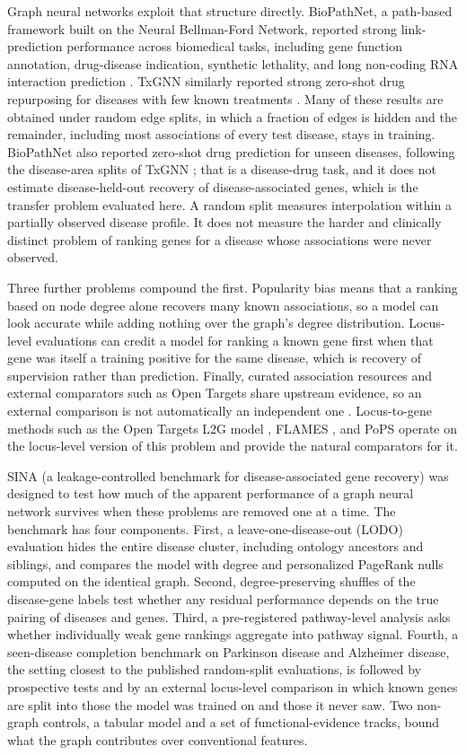 \documentclass[11pt]{article}
\begin{document}
Graph neural networks exploit that structure directly. BioPathNet, a path-based framework built on the Neural Bellman-Ford Network, reported strong link-prediction performance across biomedical tasks, including gene function annotation, drug-disease indication, synthetic lethality, and long non-coding RNA interaction prediction \cite{hu2026,zhu2021}. TxGNN similarly reported strong zero-shot drug repurposing for diseases with few known treatments \cite{huang2024}. Many of these results are obtained under random edge splits, in which a fraction of edges is hidden and the remainder, including most associations of every test disease, stays in training. BioPathNet also reported zero-shot drug prediction for unseen diseases, following the disease-area splits of TxGNN \cite{huang2024}; that is a disease-drug task, and it does not estimate disease-held-out recovery of disease-associated genes, which is the transfer problem evaluated here. A random split measures interpolation within a partially observed disease profile. It does not measure the harder and clinically distinct problem of ranking genes for a disease whose associations were never observed.

Three further problems compound the first. Popularity bias means that a ranking based on node degree alone recovers many known associations, so a model can look accurate while adding nothing over the graph's degree distribution. Locus-level evaluations can credit a model for ranking a known gene first when that gene was itself a training positive for the same disease, which is recovery of supervision rather than prediction. Finally, curated association resources and external comparators such as Open Targets share upstream evidence, so an external comparison is not automatically an independent one \cite{ochoa2021,ghoussaini2021}. Locus-to-gene methods such as the Open Targets L2G model \cite{mountjoy2021}, FLAMES \cite{schipper2025}, and PoPS \cite{weeks2023} operate on the locus-level version of this problem and provide the natural comparators for it.

SINA (a leakage-controlled benchmark for disease-associated gene recovery) was designed to test how much of the apparent performance of a graph neural network survives when these problems are removed one at a time. The benchmark has four components. First, a leave-one-disease-out (LODO) evaluation hides the entire disease cluster, including ontology ancestors and siblings, and compares the model with degree and personalized PageRank nulls computed on the identical graph. Second, degree-preserving shuffles of the disease-gene labels test whether any residual performance depends on the true pairing of diseases and genes. Third, a pre-registered pathway-level analysis asks whether individually weak gene rankings aggregate into pathway signal. Fourth, a seen-disease completion benchmark on Parkinson disease and Alzheimer disease, the setting closest to the published random-split evaluations, is followed by prospective tests and by an external locus-level comparison in which known genes are split into those the model was trained on and those it never saw. Two non-graph controls, a tabular model and a set of functional-evidence tracks, bound what the graph contributes over conventional features.
\end{document}
